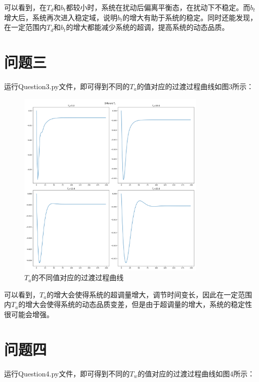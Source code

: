 \documentclass[UTF8]{ctexart}
\begin{document}
可以看到，在$T_d$和$b_t$都较小时，系统在扰动后偏离平衡态，在扰动下不稳定。而$b_t$增大后，系统再次进入稳定域，说明$b_t$的增大有助于系统的稳定。同时还能发现，在一定范围内$T_d$和$b_t$的增大都能减少系统的超调，提高系统的动态品质。

\section{问题三}

运行Question3.py文件，即可得到不同的$T_a$的值对应的过渡过程曲线如图3所示：

\begin{figure}[htbp]
    \centering
    \includegraphics[width=0.8\textwidth]{pic/dif_ta.png}
    \caption{$T_a$的不同值对应的过渡过程曲线}
\end{figure}

可以看到，$T_a$的增大会使得系统的超调量增大，调节时间变长，因此在一定范围内$T_a$的增大会使得系统的动态品质变差，但是由于超调量的增大，系统的稳定性很可能会增强。

\section{问题四}

运行Question4.py文件，即可得到不同的$T_w$的值对应的过渡过程曲线如图4所示：
\end{document}
